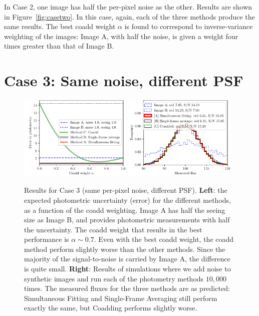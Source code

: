 \documentclass[letter,11pt]{article}
\begin{document}
In Case 2, one image has half the per-pixel noise as the other.
Results are shown in Figure~\ref{fig:casetwo}.  In this case, again,
each of the three methods produce the same results.  The best coadd
weight $\alpha$ is found to correspond to inverse-variance weighting
of the images: Image A, with half the noise, is given a weight four
times greater than that of Image B.

\newpage

\section*{Case 3: Same noise, different PSF}

\begin{figure}[b!]
  \begin{center}
    \includegraphics[width=0.48\textwidth]{coadd-04}
    \includegraphics[width=0.48\textwidth]{coadd-05}
  \end{center}
  \caption{Results for Case 3 (same per-pixel noise, different PSF).
    \textbf{Left}: the expected photometric uncertainty (error) for
    the different methods, as a function of the coadd weighting.
    Image A has half the seeing size as Image B, and provides
    photometric measurements with half the uncertainty.  The coadd
    weight that results in the best performance is $\alpha \sim 0.7$.
    Even with the best coadd weight, the coadd method perform slightly
    worse than the other methods.  Since the majority of the
    signal-to-noise is carried by Image A, the difference is quite
    small.
    \newline \textbf{Right}: Results of simulations where we add noise
    to synthetic images and run each of the photometry methods
    $10,000$ times.  The measured fluxes for the three methods are as
    predicted: Simultaneous Fitting and Single-Frame Averaging still
    perform exactly the same, but Coadding performs slightly worse.
    \label{fig:casethree}}
\end{figure}
\end{document}
